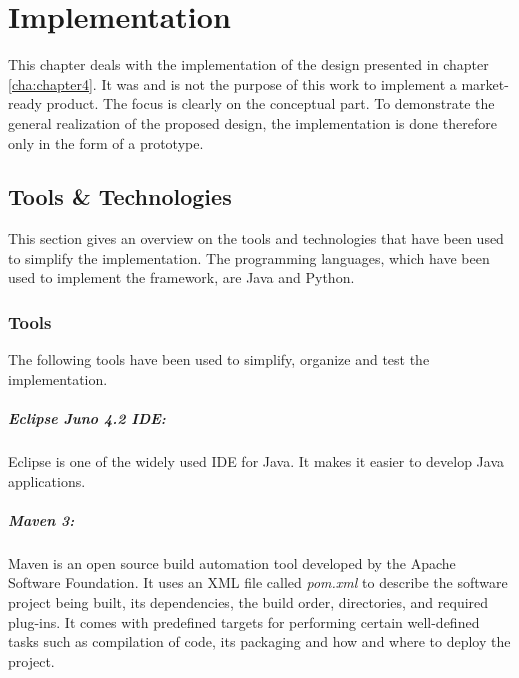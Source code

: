 \chapter{Implementation\label{cha:chapter5}}
This chapter deals with the implementation of the design presented in chapter \ref{cha:chapter4}. It was and is not the purpose of this work to implement a market-ready product. The focus is clearly on the conceptual part. To demonstrate the general realization of the proposed design, the implementation is done therefore only in the form of a prototype.



\section{Tools \& Technologies\label{sec:impl_tools_tech}}	
This section gives an overview on the tools and technologies that have been used to simplify the implementation. The programming languages, which have been used to implement the framework, are Java and Python.

\subsection{Tools\label{sec:impl_tools}}
The following tools have been used to simplify, organize and test the implementation.

\paragraph{Eclipse Juno 4.2 IDE:\label{sec:impl_eclipse}} Eclipse is one of the widely used IDE for Java. It makes it easier to develop Java applications. 

\paragraph{Maven 3:\label{sec:impl_maven}} Maven is an open source build automation tool developed by the Apache Software Foundation. It uses an \ac{XML} file called \textit{pom.xml} to describe the software project being built, its dependencies, the build order, directories, and required plug-ins. It comes with predefined targets for performing certain well-defined tasks such as compilation of code, its packaging and how and where to deploy the project.


